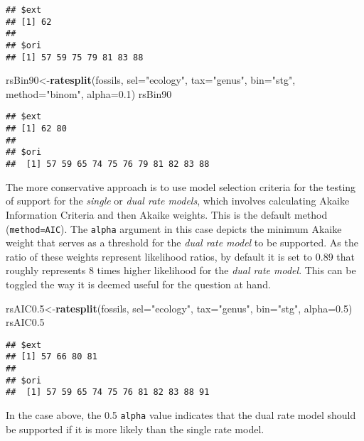 \documentclass[]{article}
\newenvironment{Shaded}{\begin{snugshade}}{\end{snugshade}}
\newcommand{\KeywordTok}[1]{\textcolor[rgb]{0.13,0.29,0.53}{\textbf{{#1}}}}
\newcommand{\DataTypeTok}[1]{\textcolor[rgb]{0.13,0.29,0.53}{{#1}}}
\newcommand{\FloatTok}[1]{\textcolor[rgb]{0.00,0.00,0.81}{{#1}}}
\newcommand{\StringTok}[1]{\textcolor[rgb]{0.31,0.60,0.02}{{#1}}}
\newcommand{\NormalTok}[1]{{#1}}
\begin{document}
\begin{verbatim}
## $ext
## [1] 62
## 
## $ori
## [1] 57 59 75 79 81 83 88
\end{verbatim}

\begin{Shaded}
\begin{Highlighting}[]
\NormalTok{rsBin90<-}\KeywordTok{ratesplit}\NormalTok{(fossils, }\DataTypeTok{sel=}\StringTok{"ecology"}\NormalTok{, }\DataTypeTok{tax=}\StringTok{"genus"}\NormalTok{, }
  \DataTypeTok{bin=}\StringTok{"stg"}\NormalTok{, }\DataTypeTok{method=}\StringTok{"binom"}\NormalTok{, }\DataTypeTok{alpha=}\FloatTok{0.1}\NormalTok{)}
\NormalTok{rsBin90}
\end{Highlighting}
\end{Shaded}

\begin{verbatim}
## $ext
## [1] 62 80
## 
## $ori
##  [1] 57 59 65 74 75 76 79 81 82 83 88
\end{verbatim}

The more conservative approach is to use model selection criteria for
the testing of support for the \emph{single } or \emph{dual rate
models}, which involves calculating Akaike Information Criteria and then
Akaike weights. This is the default method (\texttt{method=AIC}). The
\texttt{alpha} argument in this case depicts the minimum Akaike weight
that serves as a threshold for the \emph{dual rate model} to be
supported. As the ratio of these weights represent likelihood ratios, by
default it is set to 0.89 that roughly represents 8 times higher
likelihood for the \emph{dual rate model}. This can be toggled the way
it is deemed useful for the question at hand.

\begin{Shaded}
\begin{Highlighting}[]
\NormalTok{rsAIC0}\FloatTok{.5}\NormalTok{<-}\KeywordTok{ratesplit}\NormalTok{(fossils, }\DataTypeTok{sel=}\StringTok{"ecology"}\NormalTok{, }\DataTypeTok{tax=}\StringTok{"genus"}\NormalTok{, }
  \DataTypeTok{bin=}\StringTok{"stg"}\NormalTok{, }\DataTypeTok{alpha=}\FloatTok{0.5}\NormalTok{)}
\NormalTok{rsAIC0}\FloatTok{.5}
\end{Highlighting}
\end{Shaded}

\begin{verbatim}
## $ext
## [1] 57 66 80 81
## 
## $ori
##  [1] 57 59 65 74 75 76 81 82 83 88 91
\end{verbatim}

In the case above, the 0.5 \texttt{alpha} value indicates that the dual
rate model should be supported if it is more likely than the single rate
model.
\end{document}
